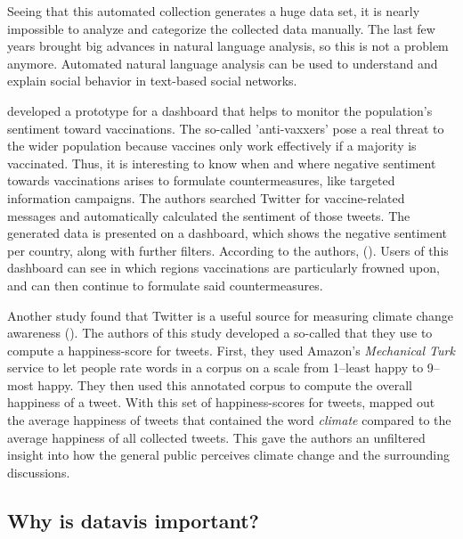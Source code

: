 Seeing that this automated collection generates a huge data set, it is nearly impossible to analyze and categorize the collected data manually. The last few years brought big advances in natural language analysis, so this is not a problem anymore. Automated natural language analysis can be used to understand and explain social behavior in text-based social networks.

\citeauthor{bahk2016publicly} developed a prototype for a dashboard that helps to monitor the population's sentiment toward vaccinations. The so-called 'anti-vaxxers' pose a real threat to the wider population because vaccines only work effectively if a majority is vaccinated. Thus, it is interesting to know when and where negative sentiment towards vaccinations arises to formulate countermeasures, like targeted information campaigns. The authors searched Twitter for vaccine-related messages and automatically calculated the sentiment of those tweets. The generated data is presented on a dashboard, which shows the negative sentiment per country, along with further filters. According to the authors,  (\cite[343]{bahk2016publicly}). Users of this dashboard can see in which regions vaccinations are particularly frowned upon, and can then continue to formulate said countermeasures.

Another study found that Twitter is a useful source for measuring climate change awareness (\cite{codyClimateChangeSentiment2015}). The authors of this study developed a so-called  that they use to compute a happiness-score for tweets. First, they used Amazon's \emph{Mechanical Turk} service to let people rate words in a corpus on a scale from 1--least happy to 9--most happy. They then used this annotated corpus to compute the overall happiness of a tweet. With this set of happiness-scores for tweets, \citeauthor{codyClimateChangeSentiment2015} mapped out the average happiness of tweets that contained the word \emph{climate} compared to the average happiness of all collected tweets. This gave the authors an unfiltered insight into how the general public perceives climate change and the surrounding discussions.


\subsection{Why is datavis important?}

